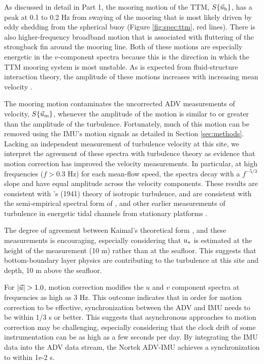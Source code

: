 As discussed in detail in Part 1, the mooring motion of the TTM, $S\{\vec{u}_\mathrm{h}\}$, has a peak at 0.1 to 0.2 Hz from swaying of the mooring that is most likely driven by eddy shedding from the spherical buoy (Figure \ref{fig:spec:ttm}, red lines). There is also higher-frequency broadband motion that is associated with fluttering of the strongback fin around the mooring line. Both of these motions are especially energetic in the $v$-component spectra because this is the direction in which the TTM mooring system is most unstable. As is expected from fluid-structure interaction theory, the amplitude of these motions increases with increasing mean velocity \cite[]{Morison++1950}.

The mooring motion contaminates the uncorrected ADV measurements of velocity, $S\{\vec{u}_\mathrm{m}\}$, whenever the amplitude of the motion is similar to or greater than the amplitude of the turbulence. Fortunately, much of this motion can be removed using the IMU's motion signals as detailed in Section \ref{sec:methods}. Lacking an independent measurement of turbulence velocity at this site, we interpret the agreement of these spectra with turbulence theory as evidence that motion correction has improved the velocity measurements. In particular, at high frequencies ($f>0.3$ Hz) for each mean-flow speed, the spectra decay with a $f^{-5/3}$ slope and have equal amplitude across the velocity components. These results are consistent with \citeauthor{Kolmogorov1941c}'s (1941) theory of isotropic turbulence, and are consistent with the semi-empirical spectral form of \cite{Kaimal++1972}, and other earlier measurements of turbulence in energetic tidal channels from stationary platforms \cite[]{Walter++2011, Thomson++2012, McMillan++2016}.

The degree of agreement between Kaimal's theoretical form \cite[][]{Walter++2011}, and these measurements is encouraging, especially considering that $u_*$ is estimated at the height of the measurement (10 m) rather than at the seafloor. This suggests that bottom-boundary layer physics are contributing to the turbulence at this site and depth, 10 m above the seafloor.

For $|\ue|>1.0$, motion correction modifies the $u$ and $v$ component spectra at frequencies as high as 3 Hz. This outcome indicates that in order for motion correction to be effective, synchronization between the ADV and IMU needs to be within 1/3 s or better. This suggests that asynchronous approaches to motion correction may be challenging, especially considering that the clock drift of some instrumentation can be as high as a few seconds per day. By integrating the IMU data into the ADV data stream, the Nortek ADV-IMU achieves a synchronization to within 1e-2 s. 

